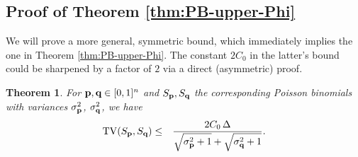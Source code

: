 \documentclass[11pt]{amsart}
\theoremstyle{plain}
\newtheorem{theorem}{Theorem}[section]
\theoremstyle{definition}
\DeclareMathOperator{\TV}{TV}
\newcommand{\beq}{\begin{eqnarray*}}
\newcommand{\eeq}{\end{eqnarray*}}
\newcommand{\CBCV}{C_0}
\renewcommand{\vec}[1]{\textup{{\bf #1}}}
\begin{document}
\subsection{Proof of Theorem \ref{thm:PB-upper-Phi}}
We will prove a more general, symmetric bound, which immediately
implies the one in Theorem \ref{thm:PB-upper-Phi}.
The constant $2\CBCV$ in the latter's bound could be sharpened by a factor of $2$ via a direct (asymmetric) proof. 



\begin{theorem}
\label{thm:PB-TV-symmetric-BCV}
For $\vec{p},\vec{q}\in[0,1]^n$ and $S_{\vec{p}},S_{\vec{q}}$ the corresponding
Poisson binomials with variances $\sigma_{\vec{p}}^2$, $\sigma_{\vec{q}}^2$,
we have
\beq
\TV(S_{\vec{p}},S_{\vec{q}})
&\le&
\frac{2\CBCV\,\Delta}{\sqrt{\sigma_{\vec{p}}^2+1}+\sqrt{\sigma_{\vec{q}}^2+1}}.
\eeq
\end{theorem}
\end{document}
